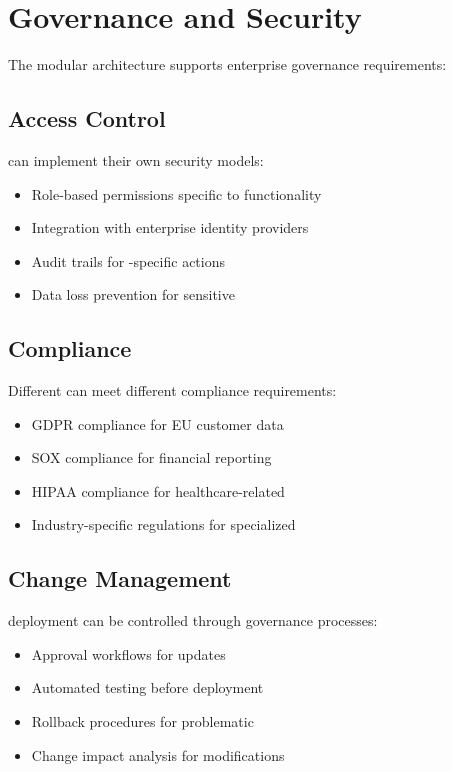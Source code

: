 \section{Governance and Security}
\label{sec:governance-security}

The modular architecture supports enterprise governance requirements:

\subsection{Access Control}

 can implement their own security models:
\begin{itemize}
\item Role-based permissions specific to \webbaselet{} functionality
\item Integration with enterprise identity providers
\item Audit trails for \webbaselet{}-specific actions
\item Data loss prevention for sensitive 
\end{itemize}

\subsection{Compliance}

Different  can meet different compliance requirements:
\begin{itemize}
\item GDPR compliance for EU customer data 
\item SOX compliance for financial reporting 
\item HIPAA compliance for healthcare-related 
\item Industry-specific regulations for specialized 
\end{itemize}

\subsection{Change Management}

\webbaselet{} deployment can be controlled through governance processes:
\begin{itemize}
\item Approval workflows for \webbaselet{} updates
\item Automated testing before \webbaselet{} deployment
\item Rollback procedures for problematic 
\item Change impact analysis for \webbaselet{} modifications
\end{itemize}

